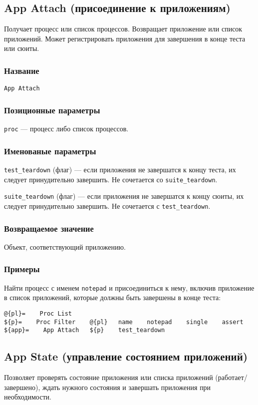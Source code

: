 \documentclass[11pt]{book} %
\begin{document}
\subsection{App Attach (присоединение к приложениям)}
Получает процесс или список процессов. Возвращает приложение или список приложений. Может регистрировать приложения для завершения в конце теста или сюиты.

\subsubsection*{Название} 
\verb"App Attach"

\subsubsection*{Позиционные параметры} 

\verb"proc" --- процесс либо список процессов.

\subsubsection*{Именованые параметры} 
\verb"test_teardown" (флаг) --- если приложения не завершатся к концу теста, их следует принудительно завершить. Не сочетается со \verb"suite_teardown".

\verb"suite_teardown" (флаг) --- если приложения не завершатся к концу сюиты, их следует принудительно завершить. Не сочетается с \verb"test_teardown".

\subsubsection*{Возвращаемое значение} 
Объект, соответствующий приложению.

\subsubsection*{Примеры}
    Найти процесс с именем \verb"notepad" и присоединиться к нему, включив приложение в список приложений, которые должны быть завершены в конце теста:

\begin{verbatim}
@{pl}=    Proc List
${p}=    Proc Filter    @{pl}   name    notepad    single    assert
${app}=    App Attach   ${p}    test_teardown
\end{verbatim}



\subsection{App State (управление состоянием приложений)}
Позволяет проверять состояние приложения или списка приложений (работает/завершено), ждать нужного состояния и завершать приложения при необходимости. 
\end{document}
